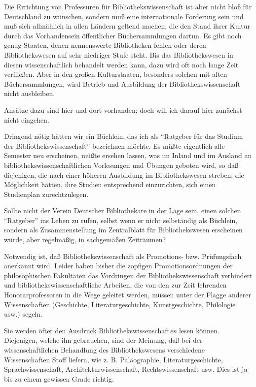 \documentclass[a4paper,
fontsize=11pt,
oneside,
numbers=noperiodatend,
parskip=half-,
bibliography=totoc,
final
]{scrartcl}
\begin{document}
Die Errichtung von Professuren für Bibliothekswissenschaft ist aber
nicht bloß für Deutschland zu wünschen, sondern muß eine internationale
Forderung sein und muß sich allmählich in allen Ländern geltend machen,
die den Stand ihrer Kultur durch das Vorhandensein öffentlicher
Büchersammlungen dartun. Es gibt noch genug Staaten, denen nennenswerte
Bibliotheken fehlen oder deren Bibliothekswesen auf sehr niedriger Stufe
steht. Bis das Bibliothekswesen in diesen wissenschaftlich behandelt
werden kann, dazu wird oft noch lange Zeit verfließen. Aber in den
großen Kulturstaaten, besonders solchen mit alten Büchersammlungen, wird
Betrieb und Ausbildung der Bibliothekswissenschaft nicht ausbleiben.

Ansätze dazu sind hier und dort vorhanden; doch will ich darauf hier
zunächst nicht eingehen.

Dringend nötig hätten wir ein Büchlein, das ich als \enquote{Ratgeber
für das Studium der Bibliothekswissenschaft} bezeichnen möchte. Es müßte
eigentlich alle Semester neu erscheinen, müßte ersehen lassen, was im
Inland und im Ausland an bibliothekswissenschaftlichen Vorlesungen und
Übungen geboten wird, so daß diejenigen, die nach einer höheren
Ausbildung im Bibliothekswesen streben, die Möglichkeit hätten, ihre
Studien entsprechend einzurichten, sich einen Studienplan
zurechtzulegen.

Sollte nicht der Verein Deutscher Bibliothekare in der Lage sein, einen
solchen \enquote{Ratgeber} ins Leben zu rufen, selbst wenn er nicht
selbständig als Büchlein, sondern als Zusammenstellung im Zentralblatt
für Bibliothekswesen erscheinen würde, aber regelmäßig, in sachgemäßen
Zeiträumen?

Notwendig ist, daß Bibliothekswissenschaft als Promotions- bzw.
Prüfungsfach anerkannt wird. Leider haben bisher die zopfigen
Promotionsordnungen der philosophischen Fakultäten das Vordringen der
Bibliothekswissenschaft verhindert und bibliothekswissenschaftliche
Arbeiten, die von den zur Zeit lehrenden Honorarprofessoren in die Wege
geleitet werden, müssen unter der Flagge anderer Wissenschaften
(Geschichte, Literaturgeschichte, Kunstgeschichte, Philologie usw.)
segeln.

Sie werden öfter den Ausdruck Bibliothekswissenschaft\emph{en} lesen
können. Diejenigen, welche ihn gebrauchen, sind der Meinung, daß bei der
wissenschaftlichen Behandlung des Bibliothekswesens verschiedene
Wissenschaften Stoff liefern, wie z. B. Paläographie,
Literaturgeschichte, Sprachwissenschaft, Architekturwissenschaft,
Rechtswissenschaft usw. Dies ist ja bis zu einem gewissen Grade richtig.
\end{document}

